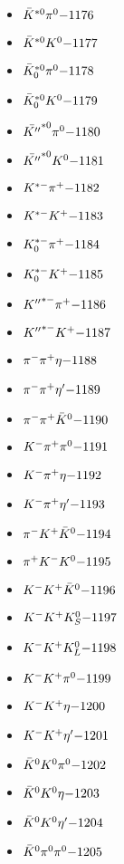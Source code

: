 \begin{multicols}{3}
\begin{itemize}
 \item $ \bar{K}^{*0} \pi^{0} \hfill{-1176}$
 \item $ \bar{K}^{*0} K^{0} \hfill{-1177}$
 \item $ \bar{K}_{0}^{*0} \pi^{0} \hfill{-1178}$
 \item $ \bar{K}_{0}^{*0} K^{0} \hfill{-1179}$
 \item $ \bar{{K^{\prime\prime}}}^{*0} \pi^{0} \hfill{-1180}$
 \item $ \bar{{K^{\prime\prime}}}^{*0} K^{0} \hfill{-1181}$
 \item $ K^{*-} \pi^{+} \hfill{-1182}$
 \item $ K^{*-} K^{+} \hfill{-1183}$
 \item $ K_{0}^{*-} \pi^{+} \hfill{-1184}$
 \item $ K_{0}^{*-} K^{+} \hfill{-1185}$
 \item $ {K^{\prime\prime}}^{*-} \pi^{+} \hfill{-1186}$
 \item $ {K^{\prime\prime}}^{*-} K^{+} \hfill{-1187}$
 \item $ \pi^{-} \pi^{+} \eta \hfill{-1188}$
 \item $ \pi^{-} \pi^{+} {\eta^{\prime}} \hfill{-1189}$
 \item $ \pi^{-} \pi^{+} \bar{K}^{0} \hfill{-1190}$
 \item $ K^{-} \pi^{+} \pi^{0} \hfill{-1191}$
 \item $ K^{-} \pi^{+} \eta \hfill{-1192}$
 \item $ K^{-} \pi^{+} {\eta^{\prime}} \hfill{-1193}$
 \item $ \pi^{-} K^{+} \bar{K}^{0} \hfill{-1194}$
 \item $ \pi^{+} K^{-} K^{0} \hfill{-1195}$
 \item $ K^{-} K^{+} \bar{K}^{0} \hfill{-1196}$
 \item $ K^{-} K^{+} K_{S}^{0} \hfill{-1197}$
 \item $ K^{-} K^{+} K_{L}^{0} \hfill{-1198}$
 \item $ K^{-} K^{+} \pi^{0} \hfill{-1199}$
 \item $ K^{-} K^{+} \eta \hfill{-1200}$
 \item $ K^{-} K^{+} {\eta^{\prime}} \hfill{-1201}$
 \item $ \bar{K}^{0} K^{0} \pi^{0} \hfill{-1202}$
 \item $ \bar{K}^{0} K^{0} \eta \hfill{-1203}$
 \item $ \bar{K}^{0} K^{0} {\eta^{\prime}} \hfill{-1204}$
 \item $ \bar{K}^{0} \pi^{0} \pi^{0} \hfill{-1205}$

\end{itemize}
\end{multicols}
